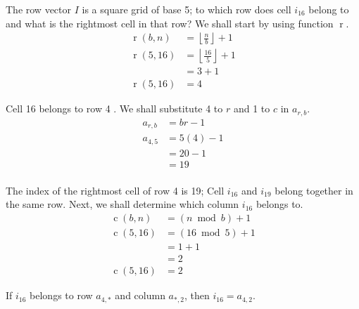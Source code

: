 \documentclass[twoside,openany,12pt]{book}
\begin{document}
    The row vector $I$ is a square grid of base 5; to which row does cell $i_{16}$ belong to and what is the rightmost cell in that row? We shall start by using function $\operatorname{r}$.
    \begin{equation*}
        \begin{split}
          \operatorname{r}(b,n) &= \left\lfloor \frac{n}{b} \right\rfloor + 1 \\
          \operatorname{r}(5,16) &= \left\lfloor \frac{16}{5} \right\rfloor + 1\\
                &= 3 + 1 \\
          \operatorname{r}(5,16) &= 4
        \end{split}
    \end{equation*}

    Cell 16 belongs to row 4 . We shall substitute 4 to $r$ and 1 to $c$ in $a_{r,b}$.
    \begin{equation*}
        \begin{split}
            a_{r,b} &= br - 1 \\
            a_{4,5} &= 5(4) - 1 \\
                    &= 20 - 1 \\
                    &= 19 \\
        \end{split}
    \end{equation*}

    The index of the rightmost cell of row 4 is 19; Cell $i_{16}$ and $i_{19}$ belong together in the same row. Next, we shall determine which column $i_{16}$ belongs to.
    \begin{equation*}
        \begin{split}
          \operatorname{c}(b,n) &= (n\bmod b) + 1 \\
          \operatorname{c}(5,16) &= (16\bmod 5) + 1 \\
                &= 1 + 1 \\
                &= 2 \\
          \operatorname{c}(5,16) &= 2
        \end{split}
    \end{equation*}

    \newpage

    If $i_{16}$ belongs to row $a_{4,*}$ and column $a_{*,2}$, then $i_{16} = a_{4,2}$.
\end{document}
